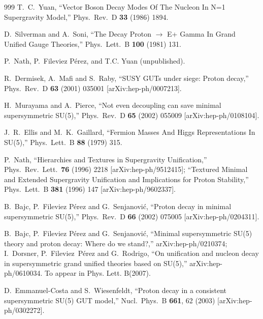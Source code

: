 \begin{thebibliography}{999}
  T.~C.~Yuan,
  ``Vector Boson Decay Modes Of The Nucleon In N=1 Supergravity Model,''
  Phys.\ Rev.\ D {\bf 33} (1986) 1894.

  D.~Silverman and A.~Soni,
  ``The Decay Proton $\to$ E+ Gamma In Grand Unified Gauge Theories,''
  Phys.\ Lett.\ B {\bf 100} (1981) 131.

  P.~Nath, P.~Fileviez P\'erez,   and T.C. Yuan (unpublished). 

  R.~Dermisek, A.~Mafi and S.~Raby,
  ``SUSY GUTs under siege: Proton decay,''
  Phys.\ Rev.\ D {\bf 63} (2001) 035001
  [arXiv:hep-ph/0007213].

  H.~Murayama and A.~Pierce,
  ``Not even decoupling can save minimal supersymmetric SU(5),''
  Phys.\ Rev.\ D {\bf 65} (2002) 055009
  [arXiv:hep-ph/0108104].

  J.~R.~Ellis and M.~K.~Gaillard,
  ``Fermion Masses And Higgs Representations In SU(5),''
  Phys.\ Lett.\ B {\bf 88} (1979) 315.

  P.~Nath,
  ``Hierarchies and Textures in Supergravity Unification,''
  Phys.\ Rev.\ Lett.\  {\bf 76} (1996) 2218
  [arXiv:hep-ph/9512415];
  ``Textured Minimal and Extended Supergravity Unification and Implications for
  Proton Stability,''
  Phys.\ Lett.\ B {\bf 381} (1996) 147
  [arXiv:hep-ph/9602337].

  B.~Bajc, P.~Fileviez P\'erez and G.~Senjanovi\'c,
  ``Proton decay in minimal supersymmetric SU(5),''
  Phys.\ Rev.\ D {\bf 66} (2002) 075005
  [arXiv:hep-ph/0204311].

  B.~Bajc, P.~Fileviez P\'erez and G.~Senjanovi\'c,
  ``Minimal supersymmetric SU(5) theory and proton decay: Where do we stand?,''
  arXiv:hep-ph/0210374;
  I.~Dorsner, P.~Fileviez~P\'erez and G.~Rodrigo,
  ``On unification and nucleon decay in supersymmetric grand unified  theories
  based on SU(5),'' arXiv:hep-ph/0610034. To appear in Phys. Lett. B(2007).


  D.~Emmanuel-Costa and S.~Wiesenfeldt,
  ``Proton decay in a consistent supersymmetric SU(5) GUT model,''
  Nucl.\ Phys.\ B {\bf 661}, 62 (2003)
  [arXiv:hep-ph/0302272].


\end{thebibliography}
